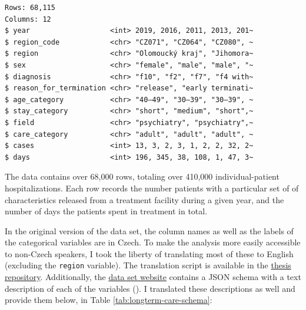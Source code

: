 \documentclass[
  openany]{book}
\theoremstyle{definition}
\theoremstyle{definition}
\theoremstyle{definition}
\theoremstyle{definition}
\theoremstyle{remark}
\begin{document}
\begin{verbatim}
Rows: 68,115
Columns: 12
$ year                   <int> 2019, 2016, 2011, 2013, 201~
$ region_code            <chr> "CZ071", "CZ064", "CZ080", ~
$ region                 <chr> "Olomoucký kraj", "Jihomora~
$ sex                    <chr> "female", "male", "male", "~
$ diagnosis              <chr> "f10", "f2", "f7", "f4 with~
$ reason_for_termination <chr> "release", "early terminati~
$ age_category           <chr> "40–49", "30–39", "30–39", ~
$ stay_category          <chr> "short", "medium", "short",~
$ field                  <chr> "psychiatry", "psychiatry",~
$ care_category          <chr> "adult", "adult", "adult", ~
$ cases                  <int> 13, 3, 2, 3, 1, 2, 2, 32, 2~
$ days                   <int> 196, 345, 38, 108, 1, 47, 3~
\end{verbatim}

The data contains over 68,000 rows, totaling over 410,000 individual-patient hospitalizations. Each row records the number patients with a particular set of of characteristics released from a treatment facility during a given year, and the number of days the patients spent in treatment in total.

In the original version of the data set, the column names as well as the labels of the categorical variables are in Czech. To make the analysis more easily accessible to non-Czech speakers, I took the liberty of translating most of these to English (excluding the \texttt{region} variable). The translation script is available in the \href{https://github.com/bartonicek/thesis/blob/master/longterm_care_translate.R}{thesis repository}. Additionally, the \href{https://www.nzip.cz/data/2060-dlouhodoba-psychiatricka-pece}{data set website} contains a JSON schema with a text description of each of the variables (). I translated these descriptions as well and provide them below, in Table \ref{tab:longterm-care-schema}:
\end{document}
